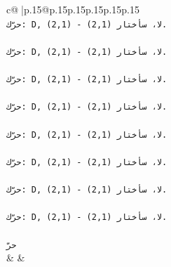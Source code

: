 \documentclass{article}
\begin{document}
{\begin{supertabular}{c@{$\;$}|p{.15\linewidth}@{}p{.15\linewidth}p{.15\linewidth}p{.15\linewidth}p{.15\linewidth}p{.15\linewidth}}
{{{\\ 
\texttt{حرّك: D, (2,1) {-} لا، سأختار (2,1).} \\
\\ 
\texttt{حرّك: D, (2,1) {-} لا، سأختار (2,1).} \\
\\ 
\texttt{حرّك: D, (2,1) {-} لا، سأختار (2,1).} \\
\\ 
\texttt{حرّك: D, (2,1) {-} لا، سأختار (2,1).} \\
\\ 
\texttt{حرّك: D, (2,1) {-} لا، سأختار (2,1).} \\
\\ 
\texttt{حرّك: D, (2,1) {-} لا، سأختار (2,1).} \\
\\ 
\texttt{حرّك: D, (2,1) {-} لا، سأختار (2,1).} \\
\\ 
\texttt{حرّك: D, (2,1) {-} لا، سأختار (2,1).} \\
\\ 
\texttt{حرّ} \\
            }
        }
    }
    & & \\ \\


\end{supertabular}}
\end{document}
